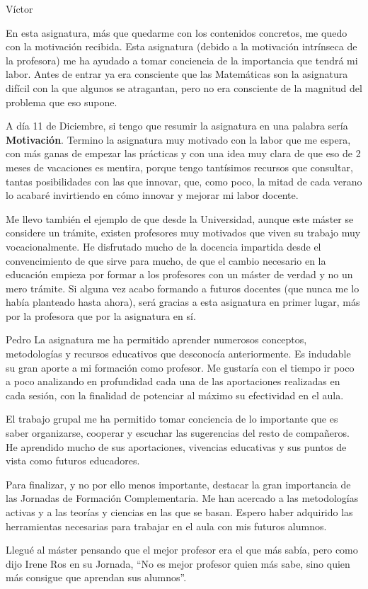 \begin{opin}{\victorcolor}{Víctor}

En esta asignatura, más que quedarme con los contenidos concretos, me quedo con la motivación recibida.
%
Esta asignatura (debido a la motivación intrínseca de la profesora) me ha ayudado a tomar conciencia de la importancia que tendrá mi labor. 
%
Antes de entrar ya era consciente que las Matemáticas son la asignatura difícil con la que algunos se atragantan, pero no era consciente de la magnitud del problema que eso supone.

A día 11 de Diciembre, si tengo que resumir la asignatura en una palabra sería \textbf{Motivación}. 
%
Termino la asignatura muy motivado con la labor que me espera, con más ganas de empezar las prácticas y con una idea muy clara de que eso de 2 meses de vacaciones es mentira, porque tengo tantísimos recursos que consultar, tantas posibilidades con las que innovar, que, como poco, la mitad de cada verano lo acabaré invirtiendo en cómo innovar y mejorar mi labor docente.

Me llevo también el ejemplo de que desde la Universidad, aunque este máster se considere un trámite, existen profesores muy motivados que viven su trabajo muy vocacionalmente. 
%
He disfrutado mucho de la docencia impartida desde el convencimiento de que sirve para mucho, de que el cambio necesario en la educación empieza por formar a los profesores con un máster de verdad y no un mero trámite. Si alguna vez acabo formando a futuros docentes (que nunca me lo había planteado hasta ahora), será gracias a esta asignatura en primer lugar, más por la profesora que por la asignatura en sí. 

\end{opin}


\begin{opin}{\pedrocolor}{Pedro}
La asignatura me ha permitido aprender numerosos conceptos, metodologías y recursos educativos que desconocía anteriormente. Es indudable su gran aporte a mi formación como profesor. Me gustaría con el tiempo ir poco a poco analizando en profundidad cada una de las aportaciones realizadas en cada sesión, con la finalidad de potenciar al máximo su efectividad en el aula. 

El trabajo grupal me ha permitido tomar conciencia de lo importante que es saber organizarse, cooperar y escuchar las sugerencias del resto de compañeros. He aprendido mucho de sus aportaciones, vivencias educativas y sus puntos de vista como futuros educadores.

Para finalizar, y no por ello menos importante, destacar la gran importancia de las Jornadas de Formación Complementaria. Me han acercado a las metodologías activas y a las teorías y ciencias en las que se basan. Espero haber adquirido las herramientas necesarias para trabajar en el aula con mis futuros alumnos. 

Llegué al máster pensando que el mejor profesor era el que más sabía, pero como dijo Irene Ros en su Jornada, “No es mejor profesor quien más sabe, sino quien más consigue que aprendan sus alumnos”.
\end{opin}

